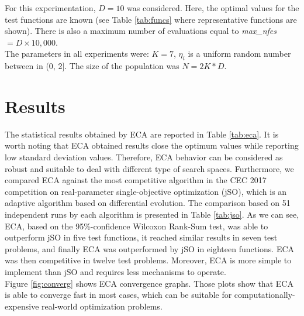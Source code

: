 \documentclass[graybox]{svmult}
\begin{document}
For this experimentation, $D = 10$ was considered. Here, the optimal values for the test 
functions are known (see Table \ref{tab:funcs} where representative functions are shown). There is also a maximum number of 
evaluations equal to \textit{max\_nfes} $= D \times 10,000$.\\

The parameters in all experiments were: $K = 7$, $\eta_i$ is a uniform random number 
between in (0, 2]. The size of the population was $N = 2K * D $.







\section{Results} %
\label{sec:results}

The statistical results obtained by ECA are reported in Table \ref{tab:eca}. 
It is worth noting  that ECA obtained results close the optimum values 
while reporting low standard deviation values. Therefore, ECA behavior can 
be considered as robust and suitable to deal with different type of search spaces. 
Furthermore, we compared ECA against the most competitive algorithm in 
the CEC 2017 competition on real-parameter single-objective optimization (jSO), 
which is an adaptive algorithm based on differential evolution. The comparison 
based on 51 independent runs by each algorithm is presented in Table \ref{tab:jso}. 
As we can see, ECA, based on the 95\%-confidence Wilcoxon Rank-Sum test, 
was able to outperform jSO in five test functions, it reached similar 
results in seven test problems, and finally ECA was outperformed by jSO 
in eighteen functions. ECA was then competitive in twelve test problems. 
Moreover, ECA is more simple to implement than jSO and requires less 
mechanisms to operate.\\

Figure \ref{fig:converg} shows ECA convergence graphs. Those plots show that 
ECA is able to converge fast in most cases, which can be suitable for 
computationally-expensive real-world optimization problems.  
\end{document}
